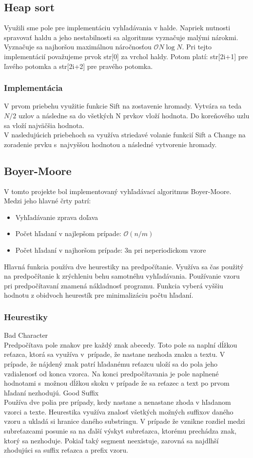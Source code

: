 \documentclass[a4paper]{article}
\begin{document}
\subsection{Heap sort}
Využili sme pole pre implementáciu vyhľadávania v halde. Napriek nutnosti spravovať haldu a jeho nestabilnosti sa algoritmus vyznačuje malými nárokmi. Vyznačuje sa najhoršou maximálnou náročnosťou $\mathcal{O}N\log{N}$.
Pri tejto implementácií považujeme prvok str[0] za vrchol haldy. Potom platí: str[2i+1] pre ľavého potomka a str[2i+2] pre pravého potomka. 
\subsubsection{Implementácia}
V prvom priebehu využitie funkcie Sift na zostavenie hromady. Vytvára sa teda $N / 2$ uzlov a následne sa do všetkých N prvkov vloží hodnota. Do koreňového uzlu sa vloží najväčšia hodnota. \\
V nasledujúcich priebehoch sa využíva striedavé volanie funkcií Sift a Change na zoradenie prvku s~najvyššou hodnotou a následné vytvorenie hromady. 
\subsection{Boyer-Moore} 
V tomto projekte bol implementovaný vyhľadávací algoritmus Boyer-Moore. Medzi jeho hlavné črty patrí:
\begin{itemize}
\item{Vyhľadávanie zprava doľava}
\item{Počet hľadaní v najlepšom prípade: $\mathcal{O}(n / m)$}
\item{Počet hľadaní v najhoršom prípade: 3n pri neperiodickom vzore}
\end{itemize}

Hlavná funkcia používa dve heurestiky na predpočítanie. Využíva  sa čas použitý na predpočítanie k zrýchleniu behu samotnéhu vyhľadávania. Používanie vzoru pri predpočítavaní znamená nákladnosť programu. Funkcia vyberá vyššiu hodnotu z obidvoch heurestík pre minimalizáciu počtu hľadaní.

\subsubsection{Heurestiky}
Bad Character\\
Predpočítava pole znakov pre každý znak abecedy. Toto pole sa naplní dĺžkou reťazca, ktorá sa využíva v~prípade, že nastane nezhoda znaku a textu. V prípade, že nájdený znak patrí hľadanému reťazcu uloží sa do pola jeho vzdialenosť od konca vzorca. Na konci predpočítavania je pole naplnené hodnotami s~možnou dĺžkou skoku v prípade že sa reťazec a text po prvom hľadaní nezhodujú.
Good Suffix\\
Používa dve polia pre prípady, kedy nastane a nenastane zhoda v hľadanom vzorci a texte. Heurestika využíva znalosť všetkých možných suffixov daného vzoru a ukladá si hranice daného substringu. V prípade že vznikne rozdiel medzi subreťazcami posunie sa na ďalší výskyt subreťazca, ktorému prechádza znak, ktorý sa nezhoduje. Pokiaľ taký segment neexistuje, zarovná sa najdlhší zhodujúci sa suffix reťazca a prefix vzoru.
\end{document}

